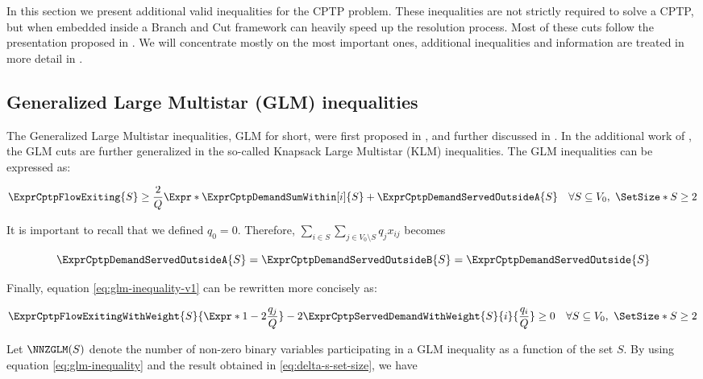 In this section we present additional valid inequalities for the CPTP problem.
These inequalities are not strictly required to solve a CPTP, but when embedded inside a Branch and Cut framework can heavily speed up the resolution process.
Most of these cuts follow the presentation proposed in \cite{jepsen2014}.
We will concentrate mostly on the most important ones, additional inequalities and information are treated in more detail in \cite{jepsen2014}.

\subsection{Generalized Large Multistar (GLM) inequalities}
The Generalized Large Multistar inequalities, GLM for short, were first proposed in \cite{gouveia1995}, and further discussed in \cite{letchford2006}.
In the additional work of \cite{letchford2002}, the GLM cuts are further generalized in the so-called Knapsack Large Multistar (KLM) inequalities.
The GLM inequalities can be expressed as:

\begin{equation}\label{eq:glm-inequality-v1}
	\begin{split}
		\ExprCptpFlowExiting{S} \ge \frac{2}{Q} \Expr*{  \ExprCptpDemandSumWithin[i]{S} + \ExprCptpDemandServedOutsideA{S} } \quad \forall S \subseteq V_0,\ \SetSize*{S} \ge 2
	\end{split}
\end{equation}

It is important to recall that we defined $q_0 = 0$.
Therefore, $\sum_{i \in S} \sum_{j \in V_0 \setminus S} q_j  x_{ij}$ becomes

\begin{equation}
	\ExprCptpDemandServedOutsideA{S} = \ExprCptpDemandServedOutsideB{S} =\ExprCptpDemandServedOutside{S}
\end{equation}

Finally, equation \eqref{eq:glm-inequality-v1} can be rewritten more concisely as:

\begin{equation}\label{eq:glm-inequality}
	\begin{split}
		\ExprCptpFlowExitingWithWeight{S}{\Expr*{1 - 2 \frac{q_j}{Q}}} - 2 	\ExprCptpServedDemandWithWeight{S}{i}{\frac{q_i}{Q}}  \ge  0   \quad \forall S \subseteq V_0,\ \SetSize*{S} \ge 2
	\end{split}
\end{equation}

Let $\NNZGLM(S)$ denote the number of non-zero binary variables participating in a GLM inequality as a function of the set $S$.
By using equation \eqref{eq:glm-inequality} and the result obtained in \eqref{eq:delta-s-set-size}, we have


